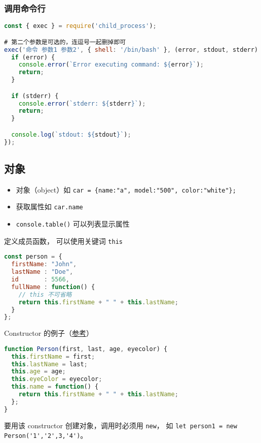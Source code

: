 \subsubsection{调用命令行}
\begin{lstlisting}[language=js]
const { exec } = require('child_process');

# 第二个参数是可选的，连逗号一起删掉即可
exec('命令 参数1 参数2', { shell: '/bin/bash' }, (error, stdout, stderr) => {
  if (error) {
    console.error(`Error executing command: ${error}`);
    return;
  }

  if (stderr) {
    console.error(`stderr: ${stderr}`);
    return;
  }

  console.log(`stdout: ${stdout}`);
});
\end{lstlisting}

\subsection{对象}
\begin{itemize}
\item 对象（object）如 \verb`car = {name:"a", model:"500", color:"white"};`
\item 获取属性如 \verb`car.name`
\item \verb`console.table()` 可以列表显示属性
\end{itemize}

定义成员函数， 可以使用关键词 \verb`this`
\begin{lstlisting}[language=js]
const person = {
  firstName: "John",
  lastName : "Doe",
  id       : 5566,
  fullName : function() {
    // this 不可省略
    return this.firstName + " " + this.lastName;
  }
};
\end{lstlisting}

Constructor 的例子（\href{https://www.w3schools.com/js/js_object_constructors.asp}{参考}）
\begin{lstlisting}[language=js]
function Person(first, last, age, eyecolor) {
  this.firstName = first;
  this.lastName = last;
  this.age = age;
  this.eyeColor = eyecolor;
  this.name = function() {
    return this.firstName + " " + this.lastName;
  };
}
\end{lstlisting}
要用该 constructor 创建对象，调用时必须用 \verb`new`， 如 \verb`let person1 = new Person('1','2',3,'4')`。

